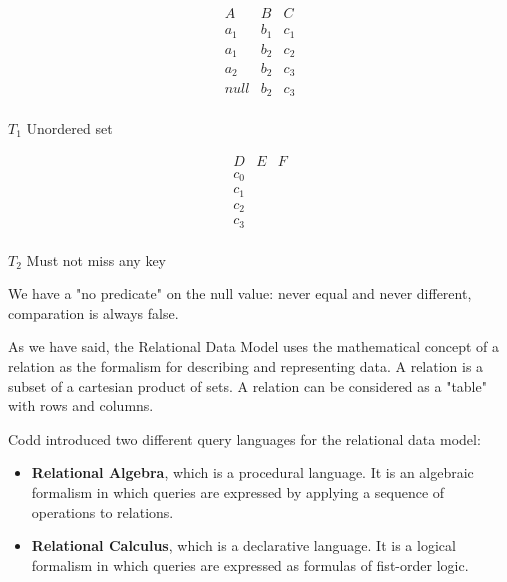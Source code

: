 \begin{table}[ht!]
    \parbox{.45\linewidth}{
        \centering
        \[
        \renewcommand\arraystretch{1.2}
        \begin{array}{|c|c|c|}
            \hline
                A & B & C\\
            \hline
                a_1 & b_1 & c_1 \\ 
            \hline
                a_1 & b_2 & c_2 \\ 
            \hline
                a_2 & b_2 & c_3 \\ 
            \hline
               null & b_2 & c_3 \\ 
        \end{array}
        \]

        \captionsetup{labelformat=empty}
        \caption*{$T_1$ {\color{red} Unordered set}}
    }
    \parbox{.45\linewidth}{
        \centering
        \[
        \renewcommand\arraystretch{1.2}
        \begin{array}{|c|c|c|}
            \hline
                D & E & F\\
            \hline
                c_0 & & \\ 
            \hline
                c_1 & & \\ 
            \hline
                c_2 & & \\ 
            \hline
                c_3 & & \\ 
        \end{array}
        \]

        \captionsetup{labelformat=empty}
        \caption*{$T_2$ {\color{red} Must not miss any key}}
    }
\end{table}
We have a "no predicate" on the null value: never equal and never different, comparation is always false.
\vspace{2em}

As we have said, the Relational Data Model uses the mathematical concept of a relation as the formalism for describing and representing data.
A relation is a subset of a cartesian product of sets.
A relation can be considered as a "table" with rows and columns.

Codd introduced two different query languages for the relational data model:
\begin{itemize}
    \item \textbf{Relational Algebra}, which is a procedural language. It is an algebraic formalism in which queries are expressed by applying a sequence of operations to relations.
    \item \textbf{Relational Calculus}, which is a declarative language. It is a logical formalism in which queries are expressed as formulas of fist-order logic.
\end{itemize}

